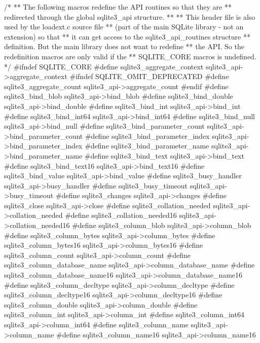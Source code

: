 \begin{Codex}[label=sqlite3ext.h,numbers=left]
/*
** The following macros redefine the API routines so that they are
** redirected through the global sqlite3_api structure.
**
** This header file is also used by the loadext.c source file
** (part of the main SQLite library - not an extension) so that
** it can get access to the sqlite3_api_routines structure
** definition.  But the main library does not want to redefine
** the API.  So the redefinition macros are only valid if the
** SQLITE_CORE macros is undefined.
*/
#ifndef SQLITE_CORE
#define sqlite3_aggregate_context      sqlite3_api->aggregate_context
#ifndef SQLITE_OMIT_DEPRECATED
#define sqlite3_aggregate_count        sqlite3_api->aggregate_count
#endif
#define sqlite3_bind_blob              sqlite3_api->bind_blob
#define sqlite3_bind_double            sqlite3_api->bind_double
#define sqlite3_bind_int               sqlite3_api->bind_int
#define sqlite3_bind_int64             sqlite3_api->bind_int64
#define sqlite3_bind_null              sqlite3_api->bind_null
#define sqlite3_bind_parameter_count   sqlite3_api->bind_parameter_count
#define sqlite3_bind_parameter_index   sqlite3_api->bind_parameter_index
#define sqlite3_bind_parameter_name    sqlite3_api->bind_parameter_name
#define sqlite3_bind_text              sqlite3_api->bind_text
#define sqlite3_bind_text16            sqlite3_api->bind_text16
#define sqlite3_bind_value             sqlite3_api->bind_value
#define sqlite3_busy_handler           sqlite3_api->busy_handler
#define sqlite3_busy_timeout           sqlite3_api->busy_timeout
#define sqlite3_changes                sqlite3_api->changes
#define sqlite3_close                  sqlite3_api->close
#define sqlite3_collation_needed       sqlite3_api->collation_needed
#define sqlite3_collation_needed16     sqlite3_api->collation_needed16
#define sqlite3_column_blob            sqlite3_api->column_blob
#define sqlite3_column_bytes           sqlite3_api->column_bytes
#define sqlite3_column_bytes16         sqlite3_api->column_bytes16
#define sqlite3_column_count           sqlite3_api->column_count
#define sqlite3_column_database_name   sqlite3_api->column_database_name
#define sqlite3_column_database_name16 sqlite3_api->column_database_name16
#define sqlite3_column_decltype        sqlite3_api->column_decltype
#define sqlite3_column_decltype16      sqlite3_api->column_decltype16
#define sqlite3_column_double          sqlite3_api->column_double
#define sqlite3_column_int             sqlite3_api->column_int
#define sqlite3_column_int64           sqlite3_api->column_int64
#define sqlite3_column_name            sqlite3_api->column_name
#define sqlite3_column_name16          sqlite3_api->column_name16

\end{Codex}
